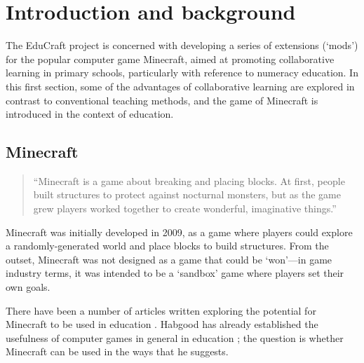 \chapter{Introduction and background}
The EduCraft project is concerned with developing a series of extensions
(`mods') for the popular computer game Minecraft, aimed at promoting
collaborative learning in primary schools, particularly with reference
to numeracy education. In this first section, some of the advantages of
collaborative learning are explored in contrast to conventional teaching
methods, and the game of Minecraft is introduced in the context of education.

\section{Minecraft}
\begin{quote}
``Minecraft is a game about breaking and placing blocks. At first, people
built structures to protect against nocturnal monsters, but as the game grew
players worked together to create wonderful, imaginative things.''
\cite{website:minecraft}
\end{quote}

Minecraft was initially developed in 2009, as a game where players could
explore a randomly-generated world and place blocks to build structures. From
the outset, Minecraft was not designed as a game that could be `won'---in
game industry terms, it was intended to be a `sandbox' game where players set
their own goals.

There have been a number of articles written exploring the potential for
Minecraft to be used in education \cite{brand13,short2012}. Habgood has
already established the usefulness of computer games in general in education
\cite{habgood2007}; the question is whether Minecraft can be used in the ways
that he suggests.
